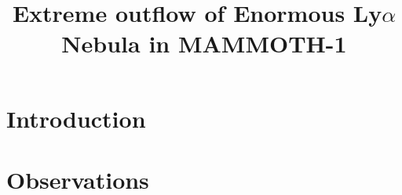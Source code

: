
\usepackage{subfiles}
\usepackage{subfig}




\title{Extreme outflow of Enormous Ly$\alpha$ Nebula in MAMMOTH-1}




%





\begin{abstract}
  
\end{abstract}

\keywords{}


\section{Introduction}
\label{introduction}



\section{Observations}
\label{sec:observations}


%
%


